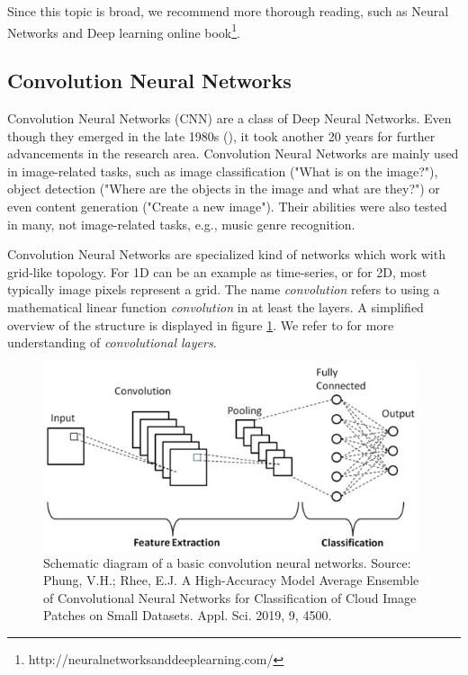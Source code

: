 Since this topic is broad, we recommend more thorough reading, such as Neural Networks and Deep learning online book\footnote{http://neuralnetworksanddeeplearning.com/}.

\subsection{Convolution Neural Networks}

Convolution Neural Networks (CNN) are a class of Deep Neural Networks. Even though they emerged in the late 1980s (\cite{lecun1989backpropagation}), it took another 20 years for further advancements in the research area. Convolution Neural Networks are mainly used in image-related tasks, such as image classification ("What is on the image?"), object detection ("Where are the objects in the image and what are they?") or even content generation ("Create a new image"). Their abilities were also tested in many, not image-related tasks, e.g., music genre recognition.

Convolution Neural Networks are specialized kind of networks which work with grid-like topology. For 1D can be an example as time-series, or for 2D, most typically image pixels represent a grid. The name \emph{convolution} refers to using a mathematical linear function \emph{convolution} in at least the layers. A simplified overview of the structure is displayed in figure \ref{fig:convolution_neural_network}. We refer to \cite{Goodfellow-et-al-2016} for more understanding of \emph{convolutional layers}.

\begin{figure}
    \centering
    \includegraphics[width=0.98\textwidth]{img/convolution_neural_network.jpg}
    \caption{Schematic diagram of a basic convolution neural networks. Source: Phung, V.H.; Rhee, E.J. A High-Accuracy Model Average Ensemble of Convolutional Neural Networks for Classification of Cloud Image Patches on Small Datasets. Appl. Sci. 2019, 9, 4500.}
    \label{fig:convolution_neural_network}
\end{figure}

